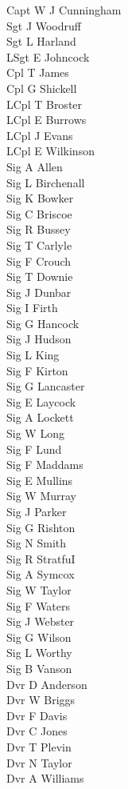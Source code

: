 \begin{multicols}{3}
  \footnotesize
  \noindent
  Capt W J Cunningham \\
  Sgt J Woodruff \\
  Sgt L Harland \\
  LSgt E Johncock \\
  Cpl T James \\
  Cpl G Shickell \\
  LCpl T Broster \\
  LCpl E Burrows \\
  LCpl J Evans \\
  LCpl E Wilkinson \\
  Sig A Allen \\
  Sig L Birchenall \\
  Sig K Bowker \\
  Sig C Briscoe \\
  Sig R Bussey \\
  Sig T Carlyle \\
  Sig F Crouch \\
  Sig T Downie \\
  Sig J Dunbar \\
  Sig I Firth \\
  Sig G Hancock \\
  Sig J Hudson \\
  Sig L King \\
  Sig F Kirton \\
  Sig G Lancaster \\
  Sig E Laycock \\
  Sig A Lockett \\
  Sig W Long \\
  Sig F Lund \\
  Sig F Maddams \\
  Sig E Mullins \\
  Sig W Murray \\
  Sig J Parker \\
  Sig G Rishton \\
  Sig N Smith \\
  Sig R StratfuI \\
  Sig A Symcox \\
  Sig W Taylor \\
  Sig F Waters \\
  Sig J Webster \\
  Sig G Wilson \\
  Sig L Worthy \\
  Sig B Vanson \\
  Dvr D Anderson \\
  Dvr W Briggs \\
  Dvr F Davis \\
  Dvr C Jones \\
  Dvr T Plevin \\
  Dvr N Taylor \\
  Dvr A Williams \\
\end{multicols}

